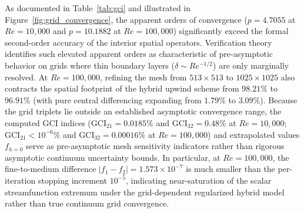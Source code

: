 \documentclass[11pt,a4paper]{article}
\begin{document}
\begin{table}[htbp]
\centering
\caption{Discretization verification using Richardson extrapolation and ASME V\&V 20-2009 / Roache Grid Convergence Index (GCI) for minimum streamfunction $\psi_{\min}$ with refinement ratio $r = 2.0$ and safety factor $F_s = 1.25$. Metrics are evaluated using full double-precision values ($|f_2 - f_1| = 1.573 \times 10^{-7}$ at $Re = 100{,}000$).}
\label{tab:gci}
\end{table}

As documented in Table~\ref{tab:gci} and illustrated in Figure~\ref{fig:grid_convergence}, the apparent orders of convergence ($p = 4.7055$ at $Re = 10{,}000$ and $p = 10.1882$ at $Re = 100{,}000$) significantly exceed the formal second-order accuracy of the interior spatial operators. Verification theory~\cite{roache1998verification,asme2009standard} identifies such elevated apparent orders as characteristic of pre-asymptotic behavior on grids where thin boundary layers ($\delta \sim Re^{-1/2}$) are only marginally resolved. At $Re = 100{,}000$, refining the mesh from $513 \times 513$ to $1025 \times 1025$ also contracts the spatial footprint of the hybrid upwind scheme from $98.21\%$ to $96.91\%$ (with pure central differencing expanding from $1.79\%$ to $3.09\%$). Because the grid triplets lie outside an established asymptotic convergence range, the computed GCI indices ($\text{GCI}_{21} = 0.0185\%$ and $\text{GCI}_{32} = 0.48\%$ at $Re = 10{,}000$; $\text{GCI}_{21} < 10^{-6}\%$ and $\text{GCI}_{32} = 0.00016\%$ at $Re = 100{,}000$) and extrapolated values $f_{h=0}$ serve as pre-asymptotic mesh sensitivity indicators rather than rigorous asymptotic continuum uncertainty bounds. In particular, at $Re = 100{,}000$, the fine-to-medium difference $|f_1 - f_2| = 1.573 \times 10^{-7}$ is much smaller than the per-iteration stopping increment $10^{-5}$, indicating near-saturation of the scalar streamfunction extremum under the grid-dependent regularized hybrid model rather than true continuum grid convergence.
\end{document}
